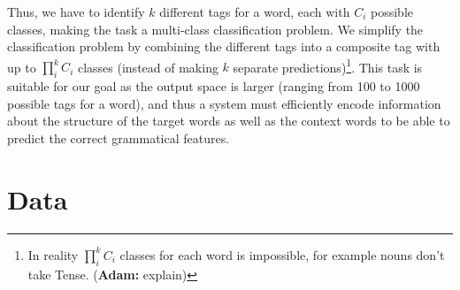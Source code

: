 \documentclass[11pt]{article}
\newcommand\adam[1]{(\textbf{Adam:} #1)}
\begin{document}

            Thus, we have to identify $k$ different tags for a word,
     each with $C_i$ possible classes, making the task a multi-class
     classification problem. We simplify the classification problem by
     combining the different tags into a composite tag with up to
     $\prod _i^k C_i$ classes (instead of making $k$ separate
     predictions)\footnote{In reality $\prod _i^k C_i$ classes for
     each word is impossible, for example nouns don't take Tense. \adam{explain}}.
                This task is suitable for our goal as the output space
     is larger (ranging from 100 to 1000 possible tags for a word),
     and thus a system must efficiently encode information about the
     structure of the target words as well as the context words to be
     able to predict the correct grammatical features.
    
    \section{Data}
    
\end{document}

